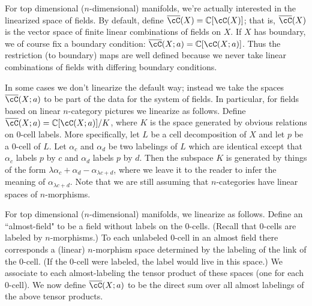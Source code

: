\documentclass[11pt,leqno]{amsart}
\begin{document}

\medskip

For top dimensional ($n$-dimensional) manifolds, we're actually interested
in the linearized space of fields.
By default, define $\lf(X) = \c[\cC(X)]$; that is, $\lf(X)$ is
the vector space of finite
linear combinations of fields on $X$.
If $X$ has boundary, we of course fix a boundary condition: $\lf(X; a) = \c[\cC(X; a)]$.
Thus the restriction (to boundary) maps are well defined because we never
take linear combinations of fields with differing boundary conditions.

In some cases we don't linearize the default way; instead we take the
spaces $\lf(X; a)$ to be part of the data for the system of fields.
In particular, for fields based on linear $n$-category pictures we linearize as follows.
Define $\lf(X; a) = \c[\cC(X; a)]/K$, where $K$ is the space generated by
obvious relations on 0-cell labels.
More specifically, let $L$ be a cell decomposition of $X$
and let $p$ be a 0-cell of $L$.
Let $\alpha_c$ and $\alpha_d$ be two labelings of $L$ which are identical except that
$\alpha_c$ labels $p$ by $c$ and $\alpha_d$ labels $p$ by $d$.
Then the subspace $K$ is generated by things of the form
$\lambda \alpha_c + \alpha_d - \alpha_{\lambda c + d}$, where we leave it to the reader
to infer the meaning of $\alpha_{\lambda c + d}$.
Note that we are still assuming that $n$-categories have linear spaces of $n$-morphisms.


For top dimensional ($n$-dimensional) manifolds, we linearize as follows.
Define an ``almost-field" to be a field without labels on the 0-cells.
(Recall that 0-cells are labeled by $n$-morphisms.)
To each unlabeled 0-cell in an almost field there corresponds a (linear) $n$-morphism
space determined by the labeling of the link of the 0-cell.
(If the 0-cell were labeled, the label would live in this space.)
We associate to each almost-labeling the tensor product of these spaces (one for each 0-cell).
We now define $\lf(X; a)$ to be the direct sum over all almost labelings of the
above tensor products.
\end{document}
